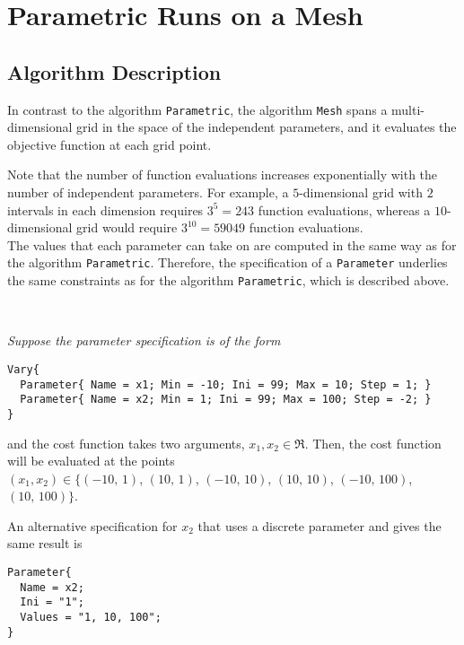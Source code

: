 \section{Parametric Runs on a Mesh}
\label{sec:algParRunGen}
\subsection{Algorithm Description}

In contrast to the algorithm \texttt{Parametric}, the algorithm \texttt{Mesh} spans a multi-dimensional grid in the space of the independent parameters, and it evaluates the objective function at each grid point.

Note that the number of function evaluations increases exponentially with the number 
of independent parameters.
For example, a $5$-dimensional grid with $2$ intervals in each dimension requires $3^5=243$ function evaluations, whereas a $10$-dimensional grid would require $3^{10}=59049$ function evaluations.\\

The values that each parameter can take on are computed in the same way
as for the algorithm \texttt{Parametric}. Therefore, the specification of a
\texttt{Parameter} underlies the same constraints as for the algorithm \texttt{Parametric}, which is described above.

\begin{example}~\\
{\em
Suppose the parameter specification is of the form
\vspace{-0.5\baselineskip}
\begin{lstlisting}
Vary{
  Parameter{ Name = x1; Min = -10; Ini = 99; Max = 10; Step = 1; } 
  Parameter{ Name = x2; Min = 1; Ini = 99; Max = 100; Step = -2; } 
}
\end{lstlisting}
\vspace{-0.5\baselineskip}
and the cost function takes two arguments, $x_1, x_2 \in \Re$.
Then, the cost function will be evaluated at the points\\
$(x_1, x_2) \in
\{(-10,\,  1)$,
$ ( 10, \, 1)$, 
$ (-10, \,  10)$, 
$ ( 10, \,  10)$, 
$ (-10, \, 100)$, 
$ ( 10, \, 100)\}$.

An alternative specification for $x_2$ that uses a discrete parameter and gives the same result is
\vspace{-0.5\baselineskip}
\begin{lstlisting}
Parameter{ 
  Name = x2; 
  Ini = "1"; 
  Values = "1, 10, 100";
} 
\end{lstlisting}
\vspace{-\baselineskip}
\rbox
}
\end{example}



